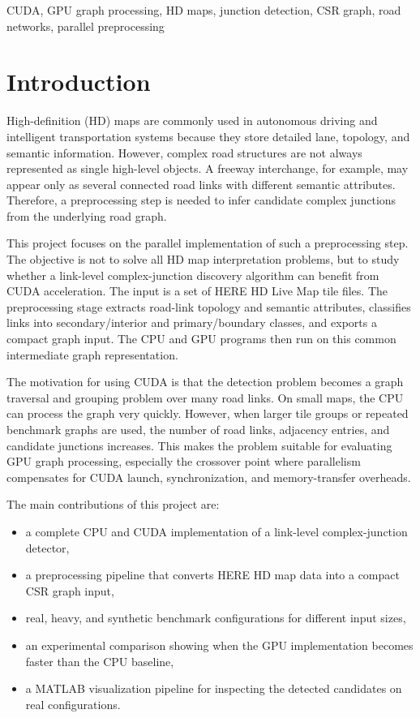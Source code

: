 \documentclass[conference]{IEEEtran}
\begin{document}
\begin{IEEEkeywords}
CUDA, GPU graph processing, HD maps, junction detection, CSR graph, road networks, parallel preprocessing
\end{IEEEkeywords}

\section{Introduction}

High-definition (HD) maps are commonly used in autonomous driving and intelligent transportation systems because they store detailed lane, topology, and semantic information. However, complex road structures are not always represented as single high-level objects. A freeway interchange, for example, may appear only as several connected road links with different semantic attributes. Therefore, a preprocessing step is needed to infer candidate complex junctions from the underlying road graph.

This project focuses on the parallel implementation of such a preprocessing step. The objective is not to solve all HD map interpretation problems, but to study whether a link-level complex-junction discovery algorithm can benefit from CUDA acceleration. The input is a set of HERE HD Live Map tile files. The preprocessing stage extracts road-link topology and semantic attributes, classifies links into secondary/interior and primary/boundary classes, and exports a compact graph input. The CPU and GPU programs then run on this common intermediate graph representation.

The motivation for using CUDA is that the detection problem becomes a graph traversal and grouping problem over many road links. On small maps, the CPU can process the graph very quickly. However, when larger tile groups or repeated benchmark graphs are used, the number of road links, adjacency entries, and candidate junctions increases. This makes the problem suitable for evaluating GPU graph processing, especially the crossover point where parallelism compensates for CUDA launch, synchronization, and memory-transfer overheads.

The main contributions of this project are:
\begin{itemize}
    \item a complete CPU and CUDA implementation of a link-level complex-junction detector,
    \item a preprocessing pipeline that converts HERE HD map data into a compact CSR graph input,
    \item real, heavy, and synthetic benchmark configurations for different input sizes,
    \item an experimental comparison showing when the GPU implementation becomes faster than the CPU baseline,
    \item a MATLAB visualization pipeline for inspecting the detected candidates on real configurations.
\end{itemize}
\end{document}
